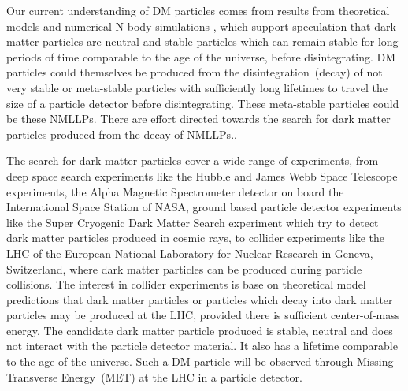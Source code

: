 \newline
Our current understanding of DM particles comes from results from theoretical models and numerical N-body simulations \cite{DMS}, which support speculation that dark matter particles are neutral and stable \ie particles which can remain stable for long periods of time comparable to the age of the universe, before disintegrating. DM particles could themselves be produced from the disintegration~(decay) of not very stable or meta-stable particles with sufficiently long lifetimes to travel the size of a particle detector before disintegrating. These meta-stable particles  could be these NMLLPs. There are effort directed towards the search for dark matter particles produced from the decay of NMLLPs..%
\par
   The search for dark matter particles cover a wide range of experiments, from deep space search experiments like the Hubble and James Webb Space Telescope experiments, the Alpha Magnetic Spectrometer detector on board the International Space Station of NASA, ground based particle detector experiments like the Super Cryogenic Dark Matter Search experiment which try to detect dark matter particles produced in cosmic rays, to collider experiments like the LHC of the European National Laboratory for Nuclear Research in Geneva, Switzerland, where dark matter particles can be produced during particle collisions. The interest in collider experiments is base on theoretical model predictions that dark matter particles or particles which decay into dark matter particles may be produced at the LHC, provided there is sufficient center-of-mass energy.
The candidate dark matter particle produced is stable, neutral and does not interact with the particle detector material. It also has a lifetime comparable to the age of the universe.  Such a DM particle will be observed through Missing Transverse Energy~(MET) at the LHC in a particle detector.
